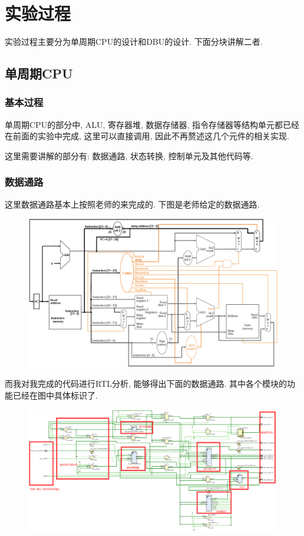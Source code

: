 \documentclass[UTF8]{article}
\begin{document}
\section{实验过程}
实验过程主要分为单周期CPU的设计和DBU的设计. 下面分块讲解二者.
\subsection{单周期CPU}
\subsubsection{基本过程}
单周期CPU的部分中, ALU, 寄存器堆, 数据存储器, 指令存储器等结构单元都已经在前面的实验中完成, 这里可以直接调用, 因此不再赘述这几个元件的相关实现.\par
这里需要讲解的部分有: 数据通路, 状态转换, 控制单元及其他代码等.\par
\subsubsection{数据通路}
这里数据通路基本上按照老师的来完成的. 下图是老师给定的数据通路.\par
\begin{figure}[H]
	\centering
	\includegraphics[width=\linewidth*2/3]{cpu_data_path_standard.png}
\end{figure}
而我对我完成的代码进行RTL分析, 能够得出下面的数据通路. 其中各个模块的功能已经在图中具体标识了.\par
\begin{figure}[H]
	\centering
	\includegraphics[width=\linewidth]{cpu_data_path_mine.png}
\end{figure}
\end{document}
